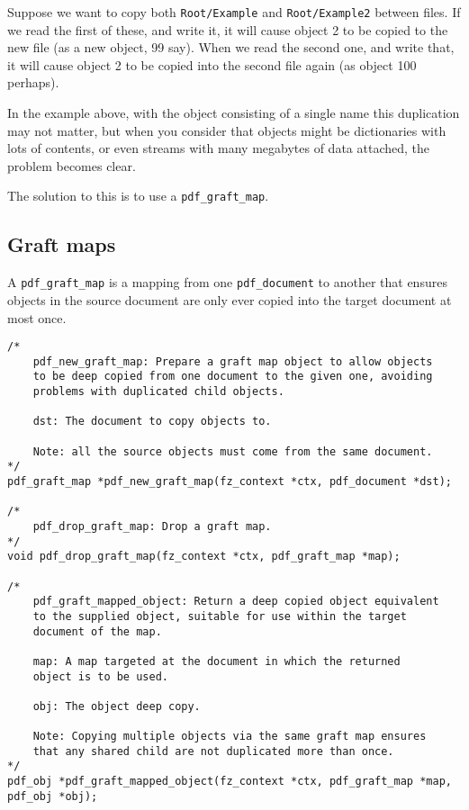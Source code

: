 \documentclass[oneside]{book}
\begin{document}
Suppose we want to copy both \texttt{Root/Example} and \texttt{Root/Example2} between files. If we read the first of these, and write it, it will cause object 2 to be copied to the new file (as a new object, 99 say). When we read the second one, and write that, it will cause object 2 to be copied into the second file again (as object 100 perhaps).

In the example above, with the object consisting of a single name this duplication may not matter, but when you consider that objects might be dictionaries with lots of contents, or even streams with many megabytes of data attached, the problem becomes clear.

The solution to this is to use a \texttt{pdf\_graft\_map}.

\subsection{Graft maps}

A \texttt{pdf\_graft\_map} is a mapping from one \texttt{pdf\_document} to another that ensures objects in the source document are only ever copied into the target document at most once.

\begin{lstlisting}
/*
	pdf_new_graft_map: Prepare a graft map object to allow objects
	to be deep copied from one document to the given one, avoiding
	problems with duplicated child objects.

	dst: The document to copy objects to.

	Note: all the source objects must come from the same document.
*/
pdf_graft_map *pdf_new_graft_map(fz_context *ctx, pdf_document *dst);

/*
	pdf_drop_graft_map: Drop a graft map.
*/
void pdf_drop_graft_map(fz_context *ctx, pdf_graft_map *map);

/*
	pdf_graft_mapped_object: Return a deep copied object equivalent
	to the supplied object, suitable for use within the target
	document of the map.

	map: A map targeted at the document in which the returned
	object is to be used.

	obj: The object deep copy.

	Note: Copying multiple objects via the same graft map ensures
	that any shared child are not duplicated more than once.
*/
pdf_obj *pdf_graft_mapped_object(fz_context *ctx, pdf_graft_map *map, pdf_obj *obj);
\end{lstlisting}
\end{document}
